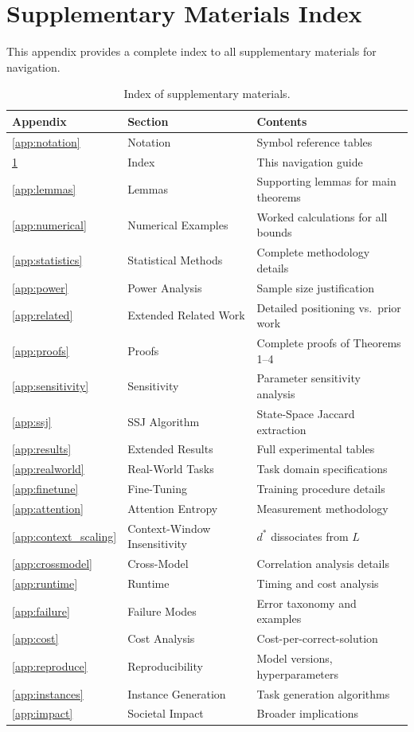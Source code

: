 \documentclass{article}
\theoremstyle{plain}
\theoremstyle{definition}
\theoremstyle{remark}
\begin{document}

\section{Supplementary Materials Index}
\label{app:index}

This appendix provides a complete index to all supplementary materials for navigation.

\begin{table}[h]
\centering
\caption{Index of supplementary materials.}
\label{tab:index}
\small
\begin{tabular}{@{}llp{6cm}@{}}
\toprule
\textbf{Appendix} & \textbf{Section} & \textbf{Contents} \\
\midrule
\ref{app:notation} & Notation & Symbol reference tables \\
\ref{app:index} & Index & This navigation guide \\
\ref{app:lemmas} & Lemmas & Supporting lemmas for main theorems \\
\ref{app:numerical} & Numerical Examples & Worked calculations for all bounds \\
\ref{app:statistics} & Statistical Methods & Complete methodology details \\
\ref{app:power} & Power Analysis & Sample size justification \\
\ref{app:related} & Extended Related Work & Detailed positioning vs.\ prior work \\
\ref{app:proofs} & Proofs & Complete proofs of Theorems 1--4 \\
\ref{app:sensitivity} & Sensitivity & Parameter sensitivity analysis \\
\ref{app:ssj} & SSJ Algorithm & State-Space Jaccard extraction \\
\ref{app:results} & Extended Results & Full experimental tables \\
\ref{app:realworld} & Real-World Tasks & Task domain specifications \\
\ref{app:finetune} & Fine-Tuning & Training procedure details \\
\ref{app:attention} & Attention Entropy & Measurement methodology \\
\ref{app:context_scaling} & Context-Window Insensitivity & $d^*$ dissociates from $L$ \\
\ref{app:crossmodel} & Cross-Model & Correlation analysis details \\
\ref{app:runtime} & Runtime & Timing and cost analysis \\
\ref{app:failure} & Failure Modes & Error taxonomy and examples \\
\ref{app:cost} & Cost Analysis & Cost-per-correct-solution \\
\ref{app:reproduce} & Reproducibility & Model versions, hyperparameters \\
\ref{app:instances} & Instance Generation & Task generation algorithms \\
\ref{app:impact} & Societal Impact & Broader implications \\
\bottomrule
\end{tabular}
\end{table}
\end{document}
